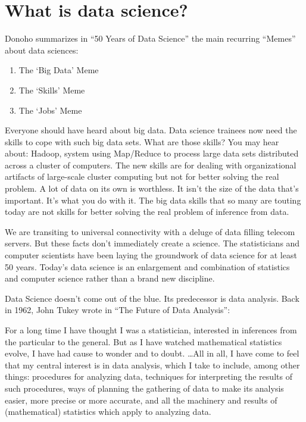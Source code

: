 \documentclass[12pt,]{krantz}
\providecommand{\tightlist}{%
  \setlength{\itemsep}{0pt}\setlength{\parskip}{0pt}}
\renewenvironment{quote}{\begin{VF}}{\end{VF}}
\theoremstyle{definition}
\theoremstyle{definition}
\theoremstyle{remark}
\begin{document}
\section{What is data science?}\label{what-is-data-science}

Donoho summarizes in ``50 Years of Data Science'' the main recurring
``Memes'' about data sciences:

\begin{enumerate}
\def\labelenumi{\arabic{enumi}.}
\tightlist
\item
  The `Big Data' Meme
\item
  The `Skills' Meme
\item
  The `Jobs' Meme
\end{enumerate}

Everyone should have heard about big data. Data science trainees now
need the skills to cope with such big data sets. What are those skills?
You may hear about: Hadoop, system using Map/Reduce to process large
data sets distributed across a cluster of computers. The new skills are
for dealing with organizational artifacts of large-scale cluster
computing but not for better solving the real problem. A lot of data on
its own is worthless. It isn't the size of the data that's important.
It's what you do with it. The big data skills that so many are touting
today are not skills for better solving the real problem of inference
from data.

We are transiting to universal connectivity with a deluge of data
filling telecom servers. But these facts don't immediately create a
science. The statisticians and computer scientists have been laying the
groundwork of data science for at least 50 years. Today's data science
is an enlargement and combination of statistics and computer science
rather than a brand new discipline.

Data Science doesn't come out of the blue. Its predecessor is data
analysis. Back in 1962, John Tukey wrote in ``The Future of Data
Analysis'':

\begin{quote}
For a long time I have thought I was a statistician, interested in
inferences from the particular to the general. But as I have watched
mathematical statistics evolve, I have had cause to wonder and to doubt.
\ldots{}All in all, I have come to feel that my central interest is in
data analysis, which I take to include, among other things: procedures
for analyzing data, techniques for interpreting the results of such
procedures, ways of planning the gathering of data to make its analysis
easier, more precise or more accurate, and all the machinery and results
of (mathematical) statistics which apply to analyzing data.
\end{quote}
\end{document}
